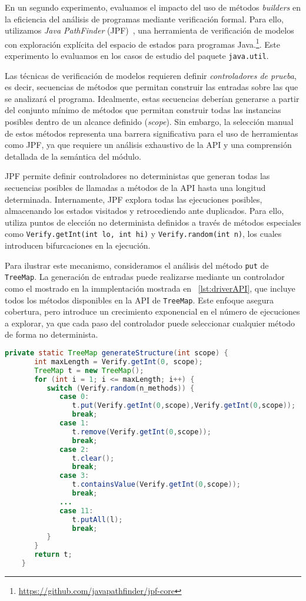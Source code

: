 \vspace{10pt}
En un segundo experimento, evaluamos el impacto del uso de métodos \emph{builders} en la eficiencia 
del análisis de programas mediante verificación formal. Para ello, utilizamos \emph{Java PathFinder} 
(JPF)~\cite{Visser:2005}, una herramienta de verificación de modelos con exploración explícita del 
espacio de estados para programas Java.\footnote{\url{https://github.com/javapathfinder/jpf-core}}. 
Este experimento lo evaluamos en los casos de estudio del paquete \texttt{java.util}.

Las técnicas de verificación de modelos requieren definir \emph{controladores de prueba}, es decir, 
secuencias de métodos que permitan construir las entradas sobre las que se analizará el programa. 
Idealmente, estas secuencias deberían generarse a partir del conjunto mínimo de métodos que permitan 
construir todas las instancias posibles dentro de un alcance definido (\emph{scope}). Sin embargo, 
la selección manual de estos métodos representa una barrera significativa para el uso de herramientas 
como JPF, ya que requiere un análisis exhaustivo de la API y una comprensión detallada de la 
semántica del módulo.

JPF permite definir controladores no deterministas que generan todas las secuencias posibles de 
llamadas a métodos de la API hasta una longitud determinada. Internamente, JPF explora todas las 
ejecuciones posibles, almacenando los estados visitados y retrocediendo ante duplicados. Para ello, 
utiliza puntos de elección no determinista definidos a través de métodos especiales como 
\verb|Verify.getInt(int lo, int hi)| y \verb|Verify.random(int n)|, los cuales introducen bifurcaciones 
en la ejecución.

Para ilustrar este mecanismo, consideramos el análisis del método \texttt{put} de \texttt{TreeMap}. 
La generación de entradas puede realizarse mediante un controlador como el mostrado en la immplentación mostrada en ~\ref{lst:driverAPI}, que incluye todos los métodos disponibles en la API de \texttt{TreeMap}. 
Este enfoque asegura cobertura, pero introduce un crecimiento exponencial en el número de ejecuciones 
a explorar, ya que cada paso del controlador puede seleccionar cualquier método de forma no 
determinista.

\begin{lstlisting}[caption={Controlador con todos los métodos},label={lst:driverAPI},language=Java,captionpos=b]
    private static TreeMap generateStructure(int scope) {
       int maxLength = Verify.getInt(0, scope);
       TreeMap t = new TreeMap();
       for (int i = 1; i <= maxLength; i++) {
          switch (Verify.random(n_methods)) {
             case 0:
                t.put(Verify.getInt(0,scope),Verify.getInt(0,scope));
                break;
             case 1:
                t.remove(Verify.getInt(0,scope));
                break;						
             case 2:
                t.clear();
                break;
             case 3:
                t.containsValue(Verify.getInt(0,scope));
                break;
             ...
             case 11: 
                t.putAll(l);
                break;
          }
       }
       return t;
    }
    \end{lstlisting}

